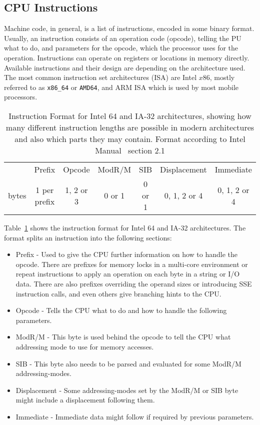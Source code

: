 \subsection{CPU Instructions}

Machine code, in general, is a list of instructions, encoded in some binary
format. Usually, an instruction consists of an operation code (opcode), telling
the PU what to do, and parameters for the opcode, which the processor
uses for the operation. Instructions can operate on registers or locations in
memory directly. Available instructions and their design are depending on the
architecture used. The most common instruction set architectures (ISA) are Intel
$x86$, mostly referred to as \texttt{x86\_64} or \texttt{AMD64}, and ARM ISA
which is used by most mobile processors.

\begin{table}[]
\centering
\begin{tabular}{ccccccc}
\cline{2-7}
\multicolumn{1}{c|}{} & \multicolumn{1}{c|}{Prefix} &
\multicolumn{1}{c|}{Opcode} & \multicolumn{1}{c|}{ModR/M} &
\multicolumn{1}{c|}{SIB} & \multicolumn{1}{c|}{Displacement} &
\multicolumn{1}{c|}{Immediate} \\ \cline{2-7}
bytes         & 1 per prefix                & 1, 2 or 3
 & 0 or 1                      & 0 or 1                   & 0, 1, 2 or 4
             & 0, 1, 2 or 4
\end{tabular}
\caption{Instruction Format for Intel 64 and IA-32 architectures, showing how
many different instruction lengths are possible in modern architectures and
also which parts they may contain. Format according to Intel
Manual~\cite{intelsys} section 2.1}
\label{tab:instrfor}
\end{table}

Table~\ref{tab:instrfor} shows the instruction format for Intel 64 and IA-32
architectures. The format splits an instruction into the following sections:

\begin{itemize}
  \item Prefix - Used to give the CPU further information on how to handle the
opcode. There are prefixes for memory locks in a multi-core environment or
repeat instructions to apply an operation on each byte in a string or I/O data.
There are also prefixes overriding the operand sizes or introducing SSE
instruction calls, and even others give branching hints to the CPU.
  \item Opcode - Tells the CPU what to do and how to handle the following
parameters.
  \item ModR/M - This byte is used behind the opcode to tell the CPU what
addressing mode to use for memory accesses.
  \item SIB - This byte also needs to be parsed and evaluated for some ModR/M
addressing-modes.
  \item Displacement - Some addressing-modes set by the ModR/M or SIB byte
might include a displacement following them.
  \item Immediate - Immediate data might follow if required by previous
parameters.
\end{itemize}

